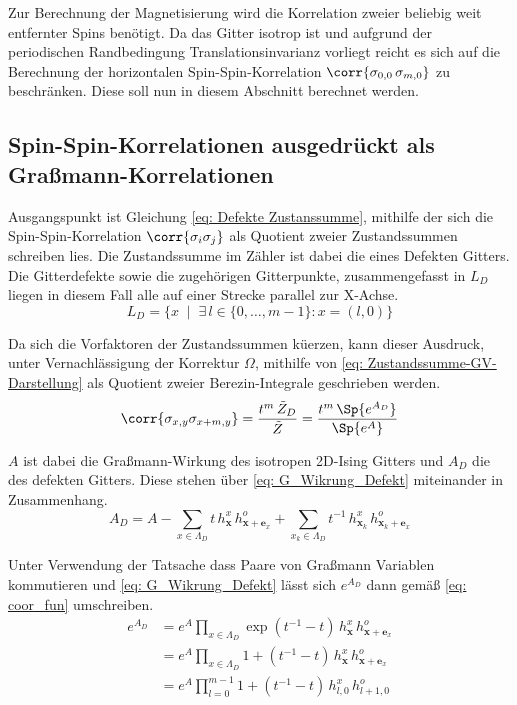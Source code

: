 Zur Berechnung der Magnetisierung wird die Korrelation zweier beliebig weit entfernter Spins benötigt. Da das Gitter isotrop ist und aufgrund der periodischen Randbedingung Translationsinvarianz vorliegt reicht es sich auf die Berechnung der horizontalen Spin-Spin-Korrelation $\corr{\sigma_{0,0}\,\sigma_{m,0}}$ zu beschränken.
Diese soll nun in diesem Abschnitt berechnet werden.

\subsection{Spin-Spin-Korrelationen ausgedrückt als Graßmann-Korrelationen}

Ausgangspunkt ist Gleichung \eqref{eq: Defekte Zustanssumme}, mithilfe der sich die Spin-Spin-Korrelation $\corr{\sigma_i \sigma_j}$ als Quotient zweier Zustandssummen schreiben lies. Die Zustandssumme im Zähler ist dabei die eines Defekten Gitters. Die Gitterdefekte sowie die zugehörigen Gitterpunkte, zusammengefasst in $L_D$ liegen in diesem Fall alle auf einer Strecke parallel zur X-Achse.
\begin{equation}
L_D = \{ x \;\;|\;\;  \exists\, l \in \{0, \dots, m-1\} : x = (l, 0)\}
\end{equation}

\noindent Da sich die Vorfaktoren der Zustandssummen küerzen, kann dieser Ausdruck, unter Vernachlässigung der Korrektur $\Omega$, mithilfe von \eqref{eq: Zustandssumme-GV-Darstellung} als Quotient zweier Berezin-Integrale geschrieben werden.  
\begin{equation} \label{eq: corr_as_Berezion_int}
\corr{\sigma_{x,y} \sigma_{x+m,y}}  = \frac{t^m \, \tilde{Z}_D}{\tilde{Z}} = \frac{t^m \, \Sp{e^{A_D}}}{\Sp{e^A}}
\end{equation}

\noindent $A$ ist dabei die Graßmann-Wirkung des isotropen 2D-Ising Gitters und $A_D$ die des defekten Gitters. Diese stehen über \eqref{eq: G_Wikrung_Defekt} miteinander in Zusammenhang.
\begin{equation} \label{eq: G_Wikrung_Defekt}
A_D = A - \sum_{x \in \Lambda_D} t\, h_{\bm{x}}^x\, h_{\bm{x} + \bm{e}_x}^o + \sum_{x_k \in \Lambda_D} t^{-1}\, h_{\bm{x}_k}^x\, h_{\bm{x}_k + \bm{e}_x}^o
\end{equation}

\noindent Unter Verwendung der Tatsache dass Paare von Graßmann Variablen kommutieren und \eqref{eq: G_Wikrung_Defekt} lässt sich $e^{A_D}$ dann gemäß \eqref{eq: coor_fun} umschreiben.
\begin{align}
e^{A_D} 
    & = e^{A} \prod_{x \in \Lambda_D} \exp{(t^{-1} - t)\, h_{\bm{x}}^x\, h_{\bm{x} + \bm{e}_x}^o} \nonumber \\
    & = e^{A} \prod_{x \in \Lambda_D} 1 + (t^{-1} - t)\, h_{\bm{x}}^x\, h_{\bm{x} + \bm{e}_x}^o \nonumber \\
    & = e^{A} \prod_{l = 0}^{m-1} 1 + (t^{-1} - t)\, h_{l,0}^x\, h_{l+1,0}^o \label{eq: coor_fun}
\end{align}

